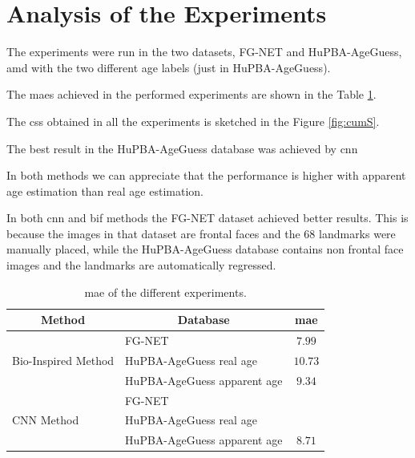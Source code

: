 \section{Analysis of the Experiments}

The experiments were run in the two datasets, FG-NET and HuPBA-AgeGuess, amd with the two different age labels (just in HuPBA-AgeGuess).


The \glspl{mae} achieved in the performed experiments are shown in the Table \ref{tab:results}.

The \glspl{cs} obtained in all the experiments is sketched in the Figure \ref{fig:cumS}.

The best result in the HuPBA-AgeGuess database was achieved by \gls{cnn}


In both methods we can appreciate that the performance is higher with apparent age estimation than real age estimation. 

In both \gls{cnn} and \gls{bif} methods the FG-NET dataset achieved better results. This is because the images in that dataset are frontal faces and the 68 landmarks were manually placed, while the HuPBA-AgeGuess database contains non frontal face images and the landmarks are automatically regressed.


\begin{table}[!h]
	\centering
	\begin{tabular}{|l|l|c|}
		\hline
		\multicolumn{1}{|c|}{\textbf{Method}} & 
		\multicolumn{1}{|c|}{\textbf{Database}} & \textbf{\gls{mae}}\\ \hline\hline%
		\multirow{3}{*}{Bio-Inspired Method} & FG-NET & $7.99$\\ 		\cline{2-3} 
				& HuPBA-AgeGuess real age & $10.73$\\ \cline{2-3}
				& HuPBA-AgeGuess apparent age & $9.34$\\ \hline\hline%
		\multirow{3}{*}{CNN Method} & FG-NET & \\ \cline{2-3}
				& HuPBA-AgeGuess real age & \\ \cline{2-3}
			
				& HuPBA-AgeGuess apparent age & $8.71$ \\ \hline
		
		
	\end{tabular}
	\caption{\gls{mae} of the different experiments.}
	\label{tab:results}
\end{table}

